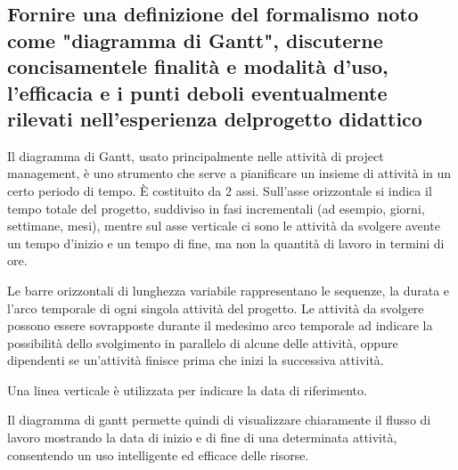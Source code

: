 \subsection{Fornire una definizione del formalismo noto come "diagramma di Gantt", discuterne concisamentele finalità e modalità d'uso, l'efficacia e i punti deboli eventualmente rilevati nell'esperienza delprogetto didattico}
Il diagramma di Gantt, usato principalmente nelle attività di project management, è uno strumento che serve a pianificare un insieme di attività in un certo periodo di tempo. È costituito da 2 assi. Sull'asse orizzontale si indica il tempo totale del progetto, suddiviso in fasi incrementali (ad esempio, giorni, settimane, mesi), mentre sul asse verticale ci sono le attività da svolgere avente un tempo d’inizio e un tempo di fine, ma non la quantità di lavoro in termini di ore. 

Le barre orizzontali di lunghezza variabile rappresentano le sequenze, la durata e l'arco temporale di ogni singola attività del progetto. Le attività da svolgere possono essere  sovrapposte durante il medesimo arco temporale ad indicare la possibilità dello svolgimento in parallelo di alcune delle attività, oppure dipendenti se un’attività finisce prima che inizi la successiva attività.

Una linea verticale è utilizzata per indicare la data di riferimento. 

Il diagramma di gantt permette quindi di visualizzare chiaramente il flusso di lavoro mostrando la data di inizio e di fine di una determinata attività, consentendo un uso intelligente ed efficace delle risorse.
